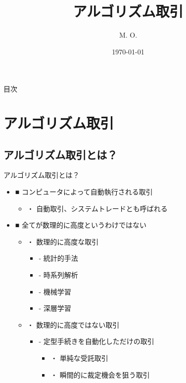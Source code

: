 \documentclass[dvipdfmx, autodetect-engine, aspectratio=169, 10.5pt]{beamer}
\title{アルゴリズム取引}
\author{M. O.}
\date{\today}
\begin{document}
\begin{frame}[plain]
	\titlepage
\end{frame}

\begin{frame}{目次}
	\tableofcontents
\end{frame}

\section{アルゴリズム取引}

\subsection{アルゴリズム取引とは？}
\begin{frame}{アルゴリズム取引とは？}
	\begin{itemize}
		\item ■ コンピュータによって自動執行される取引
		      \begin{itemize}
			      \item ・ 自動取引、システムトレードとも呼ばれる
		      \end{itemize}
		\item ■ 全てが数理的に高度というわけではない
		      \begin{itemize}
			      \item ・ 数理的に高度な取引
			            \begin{itemize}
				            \item - 統計的手法
				            \item - 時系列解析
				            \item - 機械学習
				            \item - 深層学習
			            \end{itemize}
			      \item ・ 数理的に高度ではない取引
			            \begin{itemize}
				            \item - 定型手続きを自動化しただけの取引
				                  \begin{itemize}
					                  \item ・ 単純な受託取引
					                  \item ・ 瞬間的に裁定機会を狙う取引
				                  \end{itemize}
			            \end{itemize}
		      \end{itemize}
	\end{itemize}
\end{frame}
\end{document}
